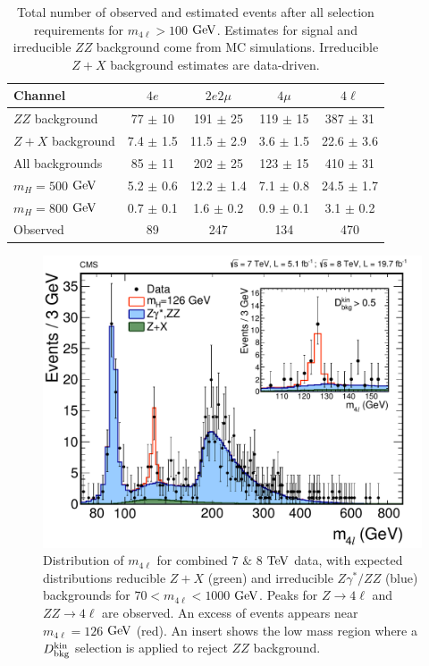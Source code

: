 \begin{table}[htbp]
\begin{center}
\begin{tabular}{l|c|c|c|c}
\hline \hline
      Channel         & $4e$ & $2e2\mu$ & $4\mu$ & $4\ell$  \\
      \hline
      $ZZ$ background  & 77  $\pm$ 10    &  191  $\pm$  25  & 119  $\pm$  15     &  387  $\pm$ 31\\
      $Z + X$  background & 7.4 $\pm$ 1.5   & 11.5  $\pm$ 2.9  & 3.6  $\pm$ 1.5     &  22.6 $\pm$ 3.6  \\
      \hline
      All backgrounds        & 85 $\pm$ 11     & 202  $\pm$ 25    &  123  $\pm$ 15     &  410 $\pm$ 31 \\
      \hline
      $m_H =  500$ $\rm{GeV}$ &  5.2  $\pm$  0.6  & 12.2  $\pm$  1.4 &   7.1  $\pm$  0.8  &  24.5 $\pm$ 1.7  \\
      $m_H =  800$ $\rm{GeV}$ &  0.7  $\pm$  0.1  &  1.6  $\pm$  0.2 &   0.9  $\pm$  0.1  &  3.1  $\pm$ 0.2 \\
      \hline
      Observed  & 89 & 247 & 134 & 470\\
\hline \hline
\end{tabular}
\caption[Number of Observed $4\ell$ Events in $100 < m_{4\ell} < 1000$ $\rm{GeV}$]{Total number of observed and estimated events after all selection requirements for $m_{4\ell} > 100$ $\rm{GeV}$. Estimates for signal and irreducible $ZZ$ background come from MC simulations. Irreducible $Z+X$ background estimates are data-driven.
\label{tbl:ZZ4lEventsFullRange}}
\end{center}
\end{table}

\begin{figure}[htbp]
\begin{center}
\includegraphics[width=.7\linewidth]{HiggsDiscovery/figures/ZZMass_7Plus8TeV_70-1000_3GeV_insert.pdf}
\caption[$m_{4\ell}$ Distributions of $4\ell$ Events]{Distribution of $m_{4\ell}$ for combined $7$  $\&$ $8$ $\rm{TeV}$ data, with expected distributions reducible $Z+X$ (green) and irreducible $Z\gamma^{*}/ZZ$ (blue) backgrounds for $70< m_{4\ell} < 1000$ $\rm{GeV}$. Peaks for $Z\rightarrow 4\ell$ and $ZZ\rightarrow 4\ell$ are observed. An excess of events appears near $m_{4\ell} = 126$ $\rm{GeV}$ (red). An insert shows the low mass region where a $D_{\rm{bkg}}^{\rm{kin}}$ selection is applied to reject $ZZ$ background.}
\label{fig:m4lPlot}
\end{center}
\end{figure}

